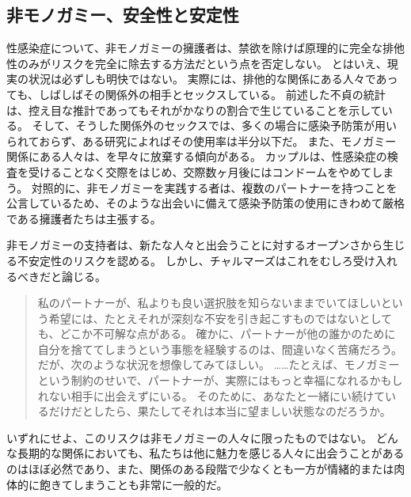 \documentclass[paper=a4,book,openany]{jlreq}
\begin{document}
\subsection{非モノガミー、安全性と安定性}

性感染症について、非モノガミーの擁護者は、禁欲を除けば原理的に完全な排他性のみがリスクを完全に除去する方法だという点を否定しない。
とはいえ、現実の状況は必ずしも明快ではない。
実際には、排他的な関係にある人々であっても、しばしばその関係外の相手とセックスしている。
前述した不貞の統計は、控え目な推計であってもそれがかなりの割合で生じていることを示している。
そして、そうした関係外のセックスでは、多くの場合に感染予防策が用いられておらず、ある研究によればその使用率は半分以下だ\citep{conley12:_unfait_indiv_are_less_likel}。
また、モノガミー関係にある人々は、を早々に放棄する傾向がある。
カップルは、性感染症の検査を受けることなく交際をはじめ、交際数ヶ月後にはコンドームをやめてしまう\citep{glauser11:_how_talk_patien_sti_screen}。
対照的に、非モノガミーを実践する者は、複数のパートナーを持つことを公言しているため、そのような出会いに備えて感染予防策の使用にきわめて厳格である擁護者たちは主張する\citep{soh16:_insig_kinky_nonmon_sex}。

非モノガミーの支持者は、新たな人々と出会うことに対するオープンさから生じる不安定性のリスクを認める。
しかし、チャルマーズはこれをむしろ受け入れるべきだと論じる。

\begin{quote}
私のパートナーが、私よりも良い選択肢を知らないままでいてほしいという希望には、たとえそれが深刻な不安を引き起こすものではないとしても、どこか不可解な点がある。
確かに、パートナーが他の誰かのために自分を捨ててしまうという事態を経験するのは、間違いなく苦痛だろう。
だが、次のような状況を想像してみてほしい。
……たとえば、モノガミーという制約のせいで、パートナーが、実際にはもっと幸福になれるかもしれない相手に出会えずにいる。
そのために、あなたと一緒にい続けているだけだとしたら、果たしてそれは本当に望ましい状態なのだろうか\citep{chalmers19:_is_monog_moral_permis}。
\end{quote}

いずれにせよ、このリスクは非モノガミーの人々に限ったものではない。
どんな長期的な関係においても、私たちは他に魅力を感じる人々に出会うことがあるのはほぼ必然であり、また、関係のある段階で少なくとも一方が情緒的または肉体的に飽きてしまうことも非常に一般的だ。
\end{document}
